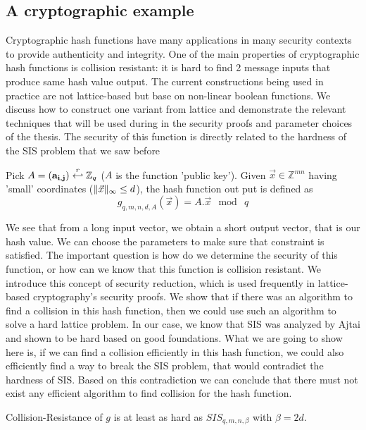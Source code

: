 \subsection{A cryptographic example}
\label{sec:ajtaiHash}
Cryptographic hash functions have many applications in many security contexts to
provide authenticity and integrity. One of the main properties of cryptographic
hash functions is collision resistant: it is hard to find 2 message inputs that
produce same hash value output. The current constructions being used in practice
are not lattice-based but base on non-linear boolean functions. We discuss how
to construct one variant from lattice and demonstrate the relevant techniques
that will be used during in the security proofs and parameter choices of the
thesis. The security of this function is directly related to the hardness of
the SIS problem that we saw before
\begin{definition}
  Pick $A=(\mathbf{a_{i,j}}) \stackrel{r}{\hookleftarrow} \mathbb{Z}_q$ ($A$ is the function
  'public key'). Given $\vec{x} \in \mathbb{Z}^{mn}$ having 'small' coordinates
  ($\Vert \vec{x} \Vert_{\infty} \leq d$), the hash function out put is defined as
  \[
    g_{q,m,n,d,A}(\vec{x}) = A . \vec{x} \mod \ q
  \]
  \label{def:Ajtai's Hash Function}
\end{definition}
We see that from a long input vector, we obtain a short output vector, that is
our hash value. We can choose the parameters to make sure that constraint is
satisfied. The important question is how do we determine the security of this
function, or how can we know that this function is collision resistant. We
introduce this concept of security reduction, which is used frequently in
lattice-based cryptography's security proofs. We show that if there
was an algorithm to find a collision in this hash function, then we could use
such an algorithm to solve a hard lattice problem. In our case, we know that SIS
was analyzed by Ajtai and shown to be hard based on good foundations. What we
are going to show here is, if we can find a collision efficiently in this hash
function, we could also efficiently find a way to break the SIS problem, that
would contradict the hardness of SIS. Based on this contradiction we can
conclude that there must not exist any efficient algorithm to find collision for
the hash function.
\begin{theorem}
  Collision-Resistance of $g$ is at least as hard as $SIS_{q,m,n,\beta}$ with
  $\beta = 2d$.
  \label{the:ajtai hash}
\end{theorem}
